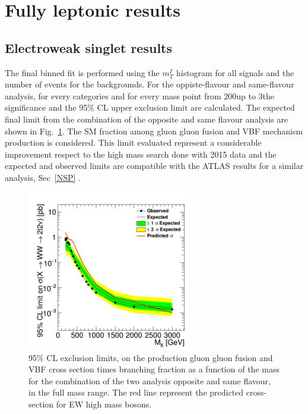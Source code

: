 
\section{Fully leptonic results}

\subsection*{Electroweak singlet results}
The final binned fit is performed using the $m_T^I$ histogram for all signals and the number of events for the backgrounds.
For the oppiste-flavour and same-flavour analysis, for every categories and for every mass point from
200\GeV up to 3\TeV the significance  and the 95\% CL
upper exclusion limit are calculated.
The expected final limit from the combination of the opposite and same flavour analysis are shown in Fig.~\ref{fig:lim_OFSF_comb}. 
The SM fraction among gluon gluon fusion and VBF mechanism production is considered.
This limit evaluated represent a considerable improvement respect to the high mass search done with 2015 data 
and the expected and observed limits are compatible with the ATLAS results for a similar analysis, Sec~\ref{NSP} .\\
\begin{figure}[htb]
\centering
\includegraphics[width=0.65\textwidth]{../AN/Figs/unblinding/Limits/c2_FullComb_unbl.png}
\caption{95$\%$ CL exclusion limits,  on the production gluon gluon fusion and VBF cross section times branching fraction as a function of the mass for the  combination of the two analysis opposite and same flavour, in the full mass range.  The red line represent the predicted cross-section for EW high mass bosons.}
\label{fig:lim_OFSF_comb}
\end{figure}


